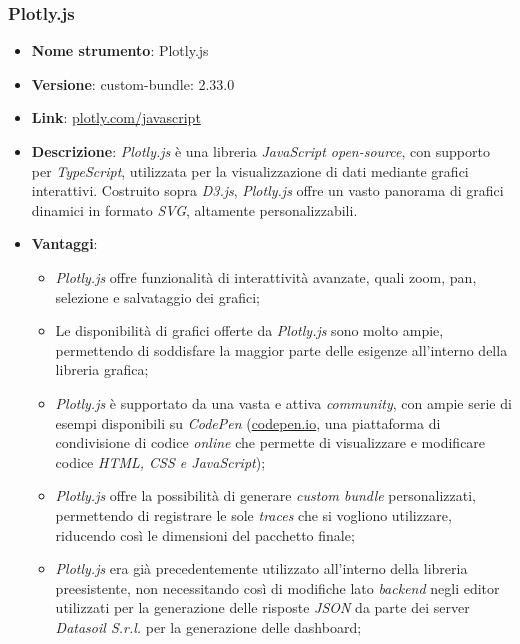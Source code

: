 \subsubsection{Plotly.js}
\begin{itemize}
      \item \textbf{Nome strumento}: Plotly.js
      \item \textbf{Versione}: custom-bundle: 2.33.0
      \item \textbf{Link}: \href{https://plotly.com/javascript/}{plotly.com/javascript}
      \item \textbf{Descrizione}: \textit{Plotly.js} è una libreria \textit{JavaScript open-source}, con supporto per \textit{TypeScript}, utilizzata per la visualizzazione di dati mediante grafici interattivi.
            Costruito sopra \textit{D3.js}, \textit{Plotly.js} offre un vasto panorama di grafici dinamici in formato \textit{\gls{SVG}\glox}, altamente personalizzabili.
      \item \textbf{Vantaggi}:
            \begin{itemize}
                  \item \textit{Plotly.js} offre funzionalità di interattività avanzate, quali zoom, pan, selezione e salvataggio dei grafici;
                  \item Le disponibilità di grafici offerte da \textit{Plotly.js} sono molto ampie, permettendo di soddisfare la maggior parte delle esigenze
                        all'interno della libreria grafica;
                  \item \textit{Plotly.js} è supportato da una vasta e attiva \textit{community}, con ampie serie di esempi disponibili su \textit{CodePen} (\href{https://codepen.io/}{codepen.io}, una piattaforma di condivisione di codice
                        \textit{online} che permette di visualizzare e modificare codice \textit{HTML, CSS e JavaScript});
                  \item \textit{Plotly.js} offre la possibilità di generare \textit{custom \gls{bundle}\glox} personalizzati, permettendo di registrare le sole \textit{traces} che si vogliono utilizzare, riducendo
                        così le dimensioni del pacchetto finale;
                  \item \textit{Plotly.js} era già precedentemente utilizzato all'interno della libreria preesistente, non necessitando così di modifiche lato \textit{\gls{backend}\glox} negli editor
                        utilizzati per la generazione delle risposte \textit{JSON} da parte dei server \textit{Datasoil S.r.l.} per la generazione delle dashboard;

\end{itemize}
\end{itemize}
